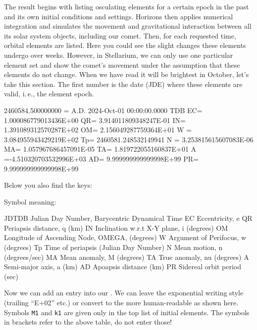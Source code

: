 \noindent The result begins with listing osculating elements for a certain epoch in the past and its own initial conditions and settings. 
Horizons then applies numerical integration and simulates the movement and gravitational interaction between all its solar system objects, including our comet. 
Then, for each requested time, orbital elements are listed. Here you could see the slight changes these elements undergo over weeks. 
However, in Stellarium, we can only use one particular element set and show the comet's movement under the assumption that these elements do not change. 
When we have read it will be brightest in October, let's take this section. The first number is the date (JDE) where these elements are valid, 
i.\,e., the element epoch.

\begin{configfile}[\scriptsize]
2460584.500000000 = A.D. 2024-Oct-01 00:00:00.0000 TDB 
 EC= 1.000086779013436E+00 QR= 3.914011809348247E-01 IN= 1.391089312570287E+02
 OM= 2.156049287759364E+01 W = 3.084955943429219E+02 Tp=  2460581.248532149941
 N = 3.253815615607083E-06 MA= 1.057967686457091E-05 TA= 1.819722055160837E+01
 A =-4.510320703532996E+03 AD= 9.999999999999998E+99 PR= 9.999999999999998E+99
\end{configfile}
Below you also find the keys:

\begin{configfile}
   Symbol meaning:

    JDTDB    Julian Day Number, Barycentric Dynamical Time
      EC     Eccentricity, e
      QR     Periapsis distance, q (km)
      IN     Inclination w.r.t X-Y plane, i (degrees)
      OM     Longitude of Ascending Node, OMEGA, (degrees)
      W      Argument of Perifocus, w (degrees)
      Tp     Time of periapsis (Julian Day Number)
      N      Mean motion, n (degrees/sec)
      MA     Mean anomaly, M (degrees)
      TA     True anomaly, nu (degrees)
      A      Semi-major axis, a (km)
      AD     Apoapsis distance (km)
      PR     Sidereal orbit period (sec)
\end{configfile} 
 
\noindent Now we can add an entry into our . 
We can leave the exponential writing style (trailing ``E+02'' etc.) 
or convert to the more human-readable as shown here. 
Symbols \texttt{M1} and \texttt{k1} are given only in the top list of initial elements. 
The symbols in brackets refer to the above table, do not enter those!

